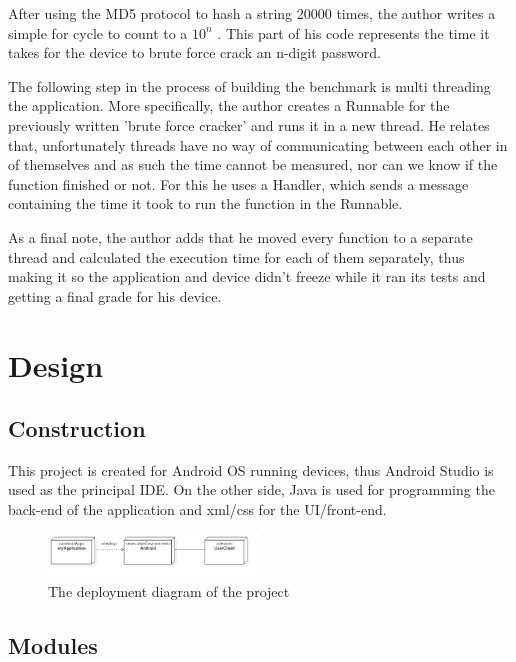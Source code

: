 \documentclass[a4paper,10pt]{report}
\begin{document}
 After using the MD5 protocol to hash a string 20000 times, the author writes a simple for cycle to count to a $ 10^n $ . This part of his code represents the time it takes for the device to brute force crack an n-digit password. 
 
 The following step in the process of building the benchmark is multi threading the application. More specifically, the author creates a Runnable for the previously written 'brute force cracker' and runs it in a new thread. He relates that, unfortunately threads have no way of communicating between each other in of themselves and as such the time cannot be measured, nor can we know if the function finished or not. For this he uses a Handler, which sends a message containing the time it took to run the function in the Runnable.
 
 As a final note, the author adds that he moved every function to a separate thread and calculated the execution time for each of them separately, thus making it so the application and device didn't freeze while it ran its tests and getting a final grade for his device.

\chapter{Design}

\section{Construction}
 This project is created for Android OS running devices, thus Android Studio is used as the principal IDE. On the other side, Java is used for programming the back-end of the application and xml/css for the UI/front-end.
 
 \begin{figure}[h]
  \centering
  \includegraphics[width=0.5\textwidth]{DeploymentDiagram1.png}
  \caption{The deployment diagram of the project}
  \label{fig:deplDiag1}
 \end{figure}
 
 \section{Modules}
 
\end{document}
